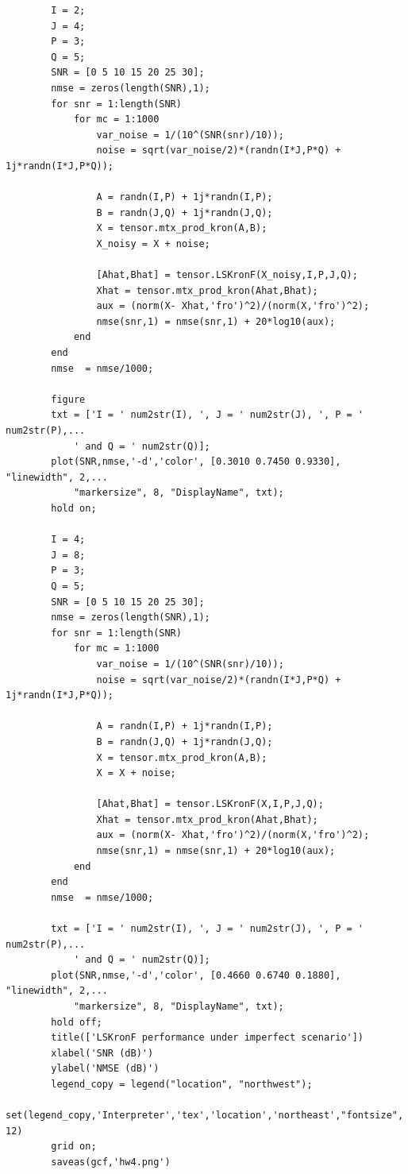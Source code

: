 \documentclass[a4paper,10pt]{article}
\begin{document}
\begin{verbatim}
        I = 2;
        J = 4;
        P = 3;
        Q = 5;
        SNR = [0 5 10 15 20 25 30];
        nmse = zeros(length(SNR),1);
        for snr = 1:length(SNR)
            for mc = 1:1000
                var_noise = 1/(10^(SNR(snr)/10));
                noise = sqrt(var_noise/2)*(randn(I*J,P*Q) + 1j*randn(I*J,P*Q));
                
                A = randn(I,P) + 1j*randn(I,P);
                B = randn(J,Q) + 1j*randn(J,Q);
                X = tensor.mtx_prod_kron(A,B);
                X_noisy = X + noise;
                
                [Ahat,Bhat] = tensor.LSKronF(X_noisy,I,P,J,Q);
                Xhat = tensor.mtx_prod_kron(Ahat,Bhat);
                aux = (norm(X- Xhat,'fro')^2)/(norm(X,'fro')^2);
                nmse(snr,1) = nmse(snr,1) + 20*log10(aux);
            end
        end
        nmse  = nmse/1000;

        figure
        txt = ['I = ' num2str(I), ', J = ' num2str(J), ', P = ' num2str(P),...
            ' and Q = ' num2str(Q)];
        plot(SNR,nmse,'-d','color', [0.3010 0.7450 0.9330], "linewidth", 2,...
            "markersize", 8, "DisplayName", txt);
        hold on;

        I = 4;
        J = 8;
        P = 3;
        Q = 5;
        SNR = [0 5 10 15 20 25 30];
        nmse = zeros(length(SNR),1);
        for snr = 1:length(SNR)
            for mc = 1:1000
                var_noise = 1/(10^(SNR(snr)/10));
                noise = sqrt(var_noise/2)*(randn(I*J,P*Q) + 1j*randn(I*J,P*Q));
                
                A = randn(I,P) + 1j*randn(I,P);
                B = randn(J,Q) + 1j*randn(J,Q);
                X = tensor.mtx_prod_kron(A,B);
                X = X + noise;
                
                [Ahat,Bhat] = tensor.LSKronF(X,I,P,J,Q);
                Xhat = tensor.mtx_prod_kron(Ahat,Bhat);
                aux = (norm(X- Xhat,'fro')^2)/(norm(X,'fro')^2);
                nmse(snr,1) = nmse(snr,1) + 20*log10(aux);
            end
        end
        nmse  = nmse/1000;

        txt = ['I = ' num2str(I), ', J = ' num2str(J), ', P = ' num2str(P),...
            ' and Q = ' num2str(Q)];
        plot(SNR,nmse,'-d','color', [0.4660 0.6740 0.1880], "linewidth", 2,...
            "markersize", 8, "DisplayName", txt);
        hold off;
        title(['LSKronF performance under imperfect scenario'])
        xlabel('SNR (dB)')
        ylabel('NMSE (dB)')
        legend_copy = legend("location", "northwest");
        set(legend_copy,'Interpreter','tex','location','northeast',"fontsize", 12)
        grid on;
        saveas(gcf,'hw4.png')
    \end{verbatim}
    
\end{document}
